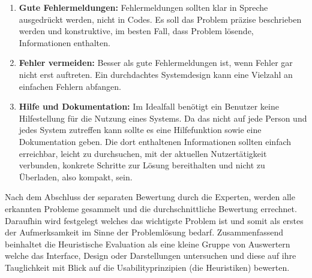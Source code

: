 \documentclass[draft=false
              ,paper=a4
              ,twoside=false
              ,fontsize=11pt
              ,headsepline
              ,BCOR10mm
              ,DIV11
              ]{scrbook}
\begin{document}
\begin{enumerate}
  \item \textbf{Gute Fehlermeldungen:} Fehlermeldungen sollten klar in Spreche ausgedrückt werden, nicht in Codes. Es soll das Problem präzise beschrieben werden und konstruktive, im besten Fall, dass Problem lösende, Informationen enthalten.
  \item \textbf{Fehler vermeiden:} Besser als gute Fehlermeldungen ist, wenn Fehler gar nicht erst auftreten. Ein durchdachtes Systemdesign kann eine Vielzahl an einfachen Fehlern abfangen.
  \item \textbf{Hilfe und Dokumentation:} Im Idealfall benötigt ein Benutzer keine Hilfestellung für die Nutzung eines Systems. Da das nicht auf jede Person und jedes System zutreffen kann sollte es eine Hilfefunktion sowie eine Dokumentation geben. Die dort enthaltenen Informationen sollten einfach erreichbar, leicht zu durchsuchen, mit der aktuellen Nutzertätigkeit verbunden, konkrete Schritte zur Lösung bereithalten und nicht zu Überladen, also kompakt, sein.
\end{enumerate}

Nach dem Abschluss der separaten Bewertung durch die Experten, werden alle erkannten Probleme gesammelt und die durchschnittliche Bewertung errechnet. Daraufhin wird festgelegt welches das wichtigste Problem ist und somit als erstes der Aufmerksamkeit im Sinne der Problemlösung bedarf.
Zusammenfassend beinhaltet die Heuristische Evaluation als eine kleine Gruppe von Auswertern welche das Interface, Design oder Darstellungen untersuchen und diese auf ihre Tauglichkeit mit Blick auf die Usabilityprinzipien (die Heuristiken) bewerten.
\end{document}
